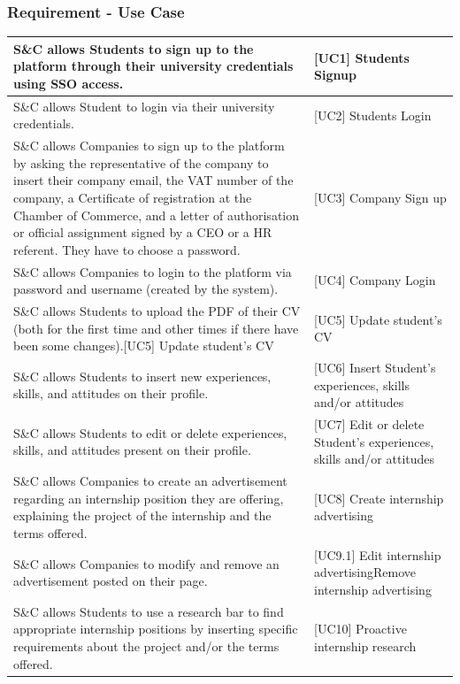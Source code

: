 \subsubsection{Requirement - Use Case}
\begin{table}[H]
    \centering
    \begin{tabular}{|p{10cm}|p{5cm}|}
    \hline
         [R1] S\&C allows Students to sign up to the platform through their university credentials using SSO access. & [UC1] Students Signup \\ \hline
         [R2] S\&C allows Student to login via their university credentials.& [UC2] Students Login\\\hline
         [R3] S\&C allows Companies to sign up to the platform by asking the representative of the company to insert their company email, the VAT number of the company, a Certificate of registration at the Chamber of Commerce, and a letter of authorisation or official assignment signed by a CEO or a HR referent. They have to choose a password. &[UC3] Company Sign up \\\hline
         [R4] S\&C allows Companies to login to the platform via password and username (created by the system). & [UC4] Company Login\\\hline
         [R5] S\&C allows Students to upload the PDF of their CV (both for the first time and other times if there have been some changes).[UC5] Update student’s CV & [UC5] Update student’s CV\\\hline
         [R6] S\&C allows Students to insert new experiences, skills, and attitudes on their profile.& [UC6] Insert Student’s experiences, skills and/or attitudes\\\hline
         [R7] S\&C allows Students to edit or delete experiences, skills, and attitudes present on their profile.&[UC7] Edit or delete Student’s experiences, skills and/or attitudes \\\hline
         [R8] S\&C allows Companies to create an advertisement regarding an internship position they are offering, explaining the project of the internship and the terms offered. &[UC8] Create internship advertising \\\hline
         [R9] S\&C allows Companies to modify and remove an advertisement posted on their page.&[UC9.1] Edit internship advertising\newline[UC9.2] Remove internship advertising \\\hline
         [R10] S\&C allows Students to use a research bar to find appropriate internship positions by inserting specific requirements about the project and/or the terms offered. & [UC10] Proactive internship research \\\hline

\end{tabular}
\end{table}
